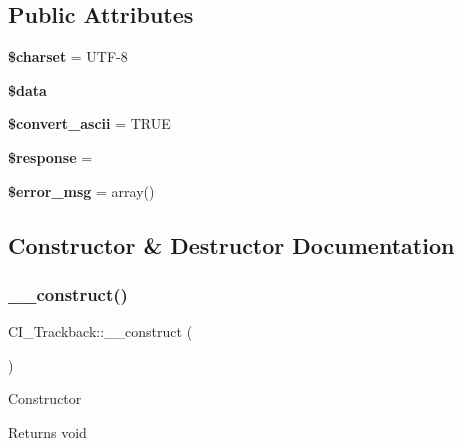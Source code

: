 \subsection*{Public Attributes}
\begin{DoxyCompactItemize}
\item 
\mbox{\label{class_c_i___trackback_a056a08aea71d24bd1840fc5f4fce0827}} 
{\bfseries \$charset} = \textquotesingle{}U\+TF-\/8\textquotesingle{}
\item 
{\bfseries \$data}
\item 
\mbox{\label{class_c_i___trackback_a6fa8daa842b37d657aecd3c478bd9e87}} 
{\bfseries \$convert\+\_\+ascii} = T\+R\+UE
\item 
\mbox{\label{class_c_i___trackback_ac68c42f44bde6bf6b3da106da087181f}} 
{\bfseries \$response} = \textquotesingle{}\textquotesingle{}
\item 
\mbox{\label{class_c_i___trackback_a675f7599cfe153b7c7e746e85f1433ea}} 
{\bfseries \$error\+\_\+msg} = array()
\end{DoxyCompactItemize}


\subsection{Constructor \& Destructor Documentation}
\mbox{\label{class_c_i___trackback_a6a46599ac08641cbfc4f82156c47222a}} 
\subsubsection{\texorpdfstring{\+\_\+\+\_\+construct()}{\_\_construct()}}
{\footnotesize\ttfamily C\+I\+\_\+\+Trackback\+::\+\_\+\+\_\+construct (\begin{DoxyParamCaption}{ }\end{DoxyParamCaption})}

Constructor

\begin{DoxyReturn}{Returns}
void 
\end{DoxyReturn}


